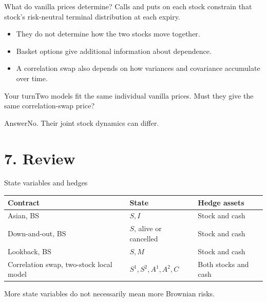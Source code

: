 \documentclass[handout,10pt,t,aspectratio=169]{beamer}
\newenvironment{pausebox}{\begin{block}{Your turn}}{\end{block}}
\newenvironment{answerbox}{\begin{exampleblock}{Answer}}{\end{exampleblock}}
\begin{document}
\begin{frame}{What do vanilla prices determine?}
\small
Calls and puts on each stock constrain that stock's risk-neutral
terminal distribution at each expiry.
\begin{itemize}
\item They do not determine how the two stocks move together.
\item Basket options give additional information about dependence.
\item A correlation swap also depends on how variances and covariance
accumulate over time.
\end{itemize}
\begin{pausebox}Two models fit the same individual vanilla prices.
Must they give the same correlation-swap price?\end{pausebox}
\begin{answerbox}No. Their joint stock dynamics can differ.\end{answerbox}
\end{frame}


\section{7. Review}

\begin{frame}{State variables and hedges}
\small
\begin{center}\begin{tabular}{L{.28\textwidth}L{.36\textwidth}L{.21\textwidth}}
\toprule Contract & State & Hedge assets\\\midrule
Asian, BS & \(S,I\) & Stock and cash\\[.8em]
Down-and-out, BS & \(S\), alive or cancelled & Stock and cash\\[.8em]
Lookback, BS & \(S,M\) & Stock and cash\\[.8em]
Correlation swap, two-stock local model & \(S^1,S^2,A^1,A^2,C\) & Both stocks and cash\\\bottomrule
\end{tabular}\end{center}
More state variables do not necessarily mean more Brownian risks.
\end{frame}
\end{document}
